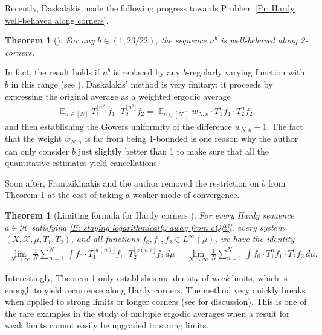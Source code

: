 \documentclass[11pt]{amsart}
\newtheorem{theorem}[lemma]{Theorem}
\theoremstyle{definition}
\DeclareMathOperator*{\E}{\mathbb{E}}
\newcommand{\CH}{{\mathcal H}}
\newcommand{\CX}{{\mathcal X}}
\newcommand{\1}{{\mathbf{1}}}
\newcommand{\sfloor}[1]{{\lfloor #1 \rfloor}}
\begin{document}
Recently, Daskalakis made the following progress towards Problem \ref{Pr: Hardy well-behaved along corners}.
\begin{theorem}[{\cite[Theorem 1.1]{Das25a}}]\label{T: Daskalakis}
    For any $b\in(1,23/22)$, the sequence $n^b$ is well-behaved along 2-corners. 
\end{theorem}
In fact, the result holds if $n^b$ is replaced by any $b$-regularly varying function with $b$ in this range (see \cite[Definition 1.3]{Das25a}). Daskalakis' method is very finitary; it proceeds by expressing the original average as a weighted ergodic average
\begin{align*}
    \E_{n\in[N]}T_1^{\sfloor{n^b}}f_1\cdot T_2^{\sfloor{n^b}}f_2 = \E_{n\in[N^c]}w_{N,n} \cdot T_1^n f_1\cdot T_2^n f_2,
\end{align*}
and then establishing the Gowers uniformity of the difference $w_{N,n}-1$. The fact that the weight $w_{N,n}$ is far from being 1-bounded is one reason why the author can only consider $b$ just slightly better than 1 to make sure that all the quantitative estimates yield cancellations.

Soon after, Frantzikinakis and the author removed the restriction on $b$ from Theorem \ref{T: Daskalakis} at the cost of taking a weaker mode of convergence.
\begin{theorem}[Limiting formula for Hardy corners {\cite[Theorem 1.1]{FrKu25}}]\label{T: FrKu sparse corners}
	   For every Hardy sequence $a\in\CH$ satisfying \eqref{E: staying logarithmically away from cQ[t]}, every system $(X,\CX,\mu,T_1, T_2)$, and all functions $f_0,f_1,f_2 \in L^\infty(\mu)$, we have the identity
 	\begin{align}\label{E: sparse corner identity}
 	    \lim_{N\to\infty} \frac{1}{N}\sum_{n=1}^N \, \int f_0\cdot T_1^{\sfloor{a(n)}}f_1\cdot T_2^{\sfloor{a(n)}}f_2\, d\mu =
	\lim_{N\to\infty} \frac{1}{N}\sum_{n=1}^N\,\int f_0\cdot   T_1^n f_1\cdot  T_2^n f_2\, d\mu.
 	\end{align}
\end{theorem}
Interestingly, Theorem \ref{T: FrKu sparse corners} only establishes an identity of \emph{weak} limits, which is enough to yield recurrence along Hardy corners. The method very quickly breaks when applied to strong limits or longer corners (see \cite[Section 3.4]{FrKu25} for discussion). This is one of the rare examples in the study of multiple ergodic averages when a result for weak limits cannot easily be upgraded to strong limits.
\end{document}
